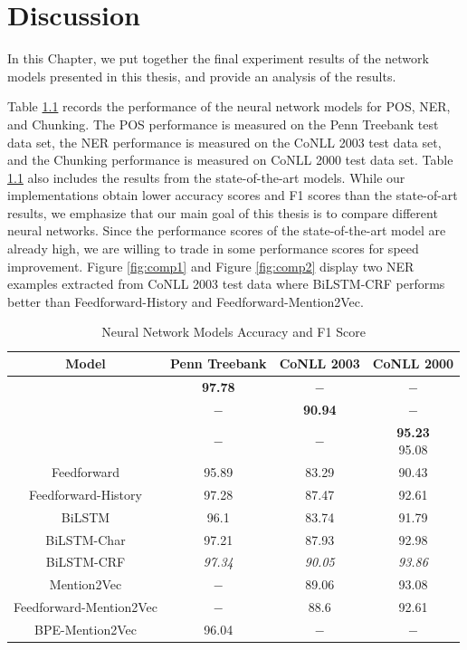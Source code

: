 \chapter{Discussion}

In this Chapter, we put together the final experiment results of the network models presented in this thesis, and provide an analysis of the results.

Table \ref{table:my-label1} records the performance of the neural network models for POS, NER, and Chunking. The POS performance is measured on the Penn Treebank test data set, the NER performance is measured on the CoNLL 2003 test data set, and the Chunking performance is measured on CoNLL 2000 test data set. Table \ref{table:my-label1} also includes the results from the state-of-the-art models. While our implementations obtain lower accuracy scores and F1 scores than the state-of-art results, we emphasize that our main goal of this thesis is to compare different neural networks. Since the performance scores of the state-of-the-art model are already high, we are willing to trade in some performance scores for speed improvement. Figure \ref{fig:comp1} and Figure \ref{fig:comp2} display two NER examples extracted from CoNLL 2003 test data where BiLSTM-CRF performs better than Feedforward-History and Feedforward-Mention2Vec. 


\begin{table}[h]
\centering
\caption{Neural Network Models Accuracy and F1 Score}
\label{table:my-label1}
\begin{tabular}{|c|c|c|c|}
\hline
Model        & Penn Treebank & CoNLL 2003 & CoNLL 2000     \\ \hline
\text{\cite{ling2015finding}} & \textbf{97.78} & $-$ & $-$ \\ \hline
\text{\cite{lample2016neural}} & $-$ & \textbf{90.94}  & $-$\\ \hline 
\makecell{\text{\cite{shen2005voting}} \\ \text{\cite{gut-besser-chunker}}} & $-$  & $-$ & \makecell{\textbf{95.23} \\ 95.08}\\ \hline 
Feedforward    & 95.89          & 83.29   & 90.43  \\ \hline
Feedforward-History & 97.28     & 87.47   & 92.61     \\ \hline
BiLSTM  & 96.1    & 83.74     & 91.79         \\ \hline
BiLSTM-Char & 97.21 & 87.93     & 92.98       \\ \hline
BiLSTM-CRF & \textit{97.34}  & \textit{90.05}  & \textit{93.86}     \\ \hline
Mention2Vec  & $-$    & 89.06  & 93.08  \\ \hline
Feedforward-Mention2Vec  & $-$    & 88.6  & 92.61  \\ \hline
BPE-Mention2Vec & 96.04  & $-$   & $-$   \\ \hline   
\end{tabular}
\end{table}


